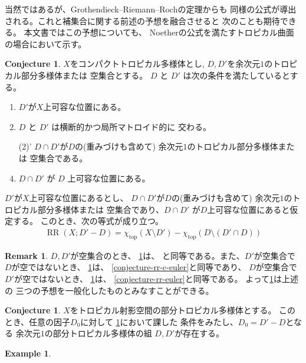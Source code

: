 \documentclass[a4paper,dvipdfmx,reqno,12pt]{amsart}
\theoremstyle{definition}
\newtheorem{example}[theorem]{Example}
\newtheorem{conjecture}[theorem]{Conjecture}
\newtheorem{remark}[theorem]{Remark}
\newcommand{\opn}[1]{\operatorname{#1}}
\numberwithin{equation}{section}
\begin{document}
当然ではあるが、Grothendieck--Riemann--Rochの定理からも
同様の公式が導出される。これと補集合に関する前述の予想を融合させると
次のことも期待できる。
本文書ではこの予想についても、
Noetherの公式を満たすトロピカル曲面の場合において示す。
\begin{conjecture}
\label{conjecture-rr-bertini}
$X$をコンパクトトロピカル多様体とし, 
$D,D'$を余次元$1$のトロピカル部分多様体または
空集合とする。
$D$ と $D'$ は次の条件を満たしているとする。
\begin{enumerate}
\item $D'$が$X$上可容な位置にある。
\item $D$ と $D'$ は横断的かつ局所マトロイド的に
交わる。
\item[(2)'] $D\cap D'$が$D$の(重みづけも含めて)
余次元$1$のトロピカル部分多様体または
空集合である。
\item $D\cap D'$ が $D$ 上可容な位置にある。
\end{enumerate}

$D'$が$X$上可容な位置にあるとし、
$D\cap D'$が$D$の(重みづけも含めて)
余次元$1$のトロピカル部分多様体または
空集合であり、$D\cap D'$ が$D$上可容な位置にあると仮定する。
このとき、次の等式が成り立つ。
\begin{align}
\opn{RR}(X;D'-D)=\chi_{\opn{top}}(X\setminus D')-
\chi_{\opn{top}}(D\setminus (D'\cap D))
\end{align}

\end{conjecture}

\begin{remark}
$D,D'$が空集合のとき、
\cref{conjecture-rr-bertini}は、
\cite[Conjecture 6.13]{demedrano2023chern}
と同等である。また、$D'$が空集合で$D$が空ではないとき、
\cref{conjecture-rr-bertini}は、
\cref{conjecture-rr-c-euler}と同等であり、
$D$が空集合で$D'$が空ではないとき、
\cref{conjecture-rr-bertini}は、
\cref{conjecture-rr-euler}と同等である。
よって\cref{conjecture-rr-bertini}は上述の
三つの予想を一般化したものとみなすことができる。
\end{remark}

\begin{conjecture}
$X$をトロピカル射影空間の部分トロピカル多様体とする。
このとき、任意の因子$D_0$に対して
\cref{conjecture-rr-bertini}において課した
条件をみたし、$D_0=D'-D$となる
余次元$1$の部分トロピカル多様体の組
$D,D'$が存在する。
\end{conjecture}

\begin{example}
     
\end{example}
\end{document}
